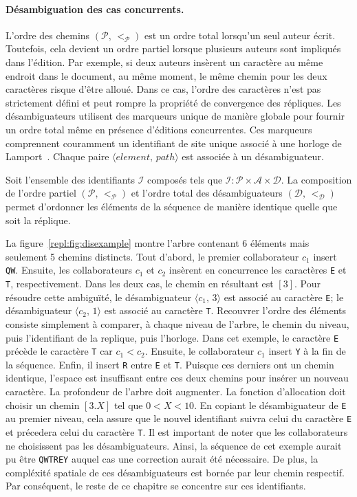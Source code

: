 \paragraph{Désambiguation des cas concurrents.}

L'ordre des chemins $(\mathcal{P},\, <_\mathcal{P})$ est un ordre total
lorsqu'un seul auteur écrit. Toutefois, cela devient un ordre partiel lorsque
plusieurs auteurs sont impliqués dans l'édition. Par exemple, si deux auteurs
insèrent un caractère au même endroit dans le document, au même moment, le même
chemin pour les deux caractères risque d'être alloué. Dans ce cas, l'ordre des
caractères n'est pas strictement défini et peut rompre la propriété de
convergence des répliques. Les désambiguateurs utilisent des marqueurs unique de
manière globale pour fournir un ordre total même en présence d'éditions
concurrentes. Ces marqueurs comprennent couramment un identifiant de site unique
associé à une horloge de Lamport~\cite{lamport1978time}. Chaque paire
$\langle element,\, path\rangle$ est associée à un désambiguateur.

Soit l'ensemble des identifiants $\mathcal{I}$ composés tels que
$\mathcal{I} : \mathcal{P} \times \mathcal{A} \times \mathcal{D}$. La
composition de l'ordre partiel $(\mathcal{P},\,<_\mathcal{P})$ et l'ordre total
des désambiguateurs $(\mathcal{D},\, <_\mathcal{D})$ permet d'ordonner les
éléments de la séquence de manière identique quelle que soit la réplique.

La figure~\ref{repl:fig:disexample} montre l'arbre contenant 6 éléments mais
seulement 5 chemins distincts. Tout d'abord, le premier collaborateur $c_1$
insert \texttt{QW}. Ensuite, les collaborateurs $c_1$ et $c_2$ insèrent en
concurrence les caractères \texttt{E} et \texttt{T}, respectivement. Dans les
deux cas, le chemin en résultant est $[3]$. Pour résoudre cette ambiguïté, le
désambiguateur $\langle c_1,\, 3 \rangle$ est associé au caractère \texttt{E};
le désambiguateur $\langle c_2,\, 1 \rangle$ est associé au caractère
\texttt{T}. Recouvrer l'ordre des éléments consiste simplement à comparer, à
chaque niveau de l'arbre, le chemin du niveau, puis l'identifiant de la
replique, puis l'horloge. Dans cet exemple, le caractère \texttt{E} précède le
caractère \texttt{T} car $c_1< c_2$. Ensuite, le collaborateur $c_1$ insert
\texttt{Y} à la fin de la séquence. Enfin, il insert \texttt{R} entre \texttt{E}
et \texttt{T}. Puisque ces derniers ont un chemin identique, l'espace est
insuffisant entre ces deux chemins pour insérer un nouveau caractère. La
profondeur de l'arbre doit augmenter. La fonction d'allocation doit choisir un
chemin $[3.X]$ tel que $0<X<10$. En copiant le désambiguateur de \texttt{E} au
premier niveau, cela assure que le nouvel identifiant suivra celui du caractère
\texttt{E} et précedera celui du caractère \texttt{T}. Il est important de noter
que les collaborateurs ne choisissent pas les désambiguateurs. Ainsi, la
séquence de cet exemple aurait pu être \texttt{QWTREY} auquel cas une correction
aurait été nécessaire. De plus, la compléxité spatiale de ces désambiguateurs
est bornée par leur chemin respectif. Par conséquent, le reste de ce chapitre se
concentre sur ces identifiants.

